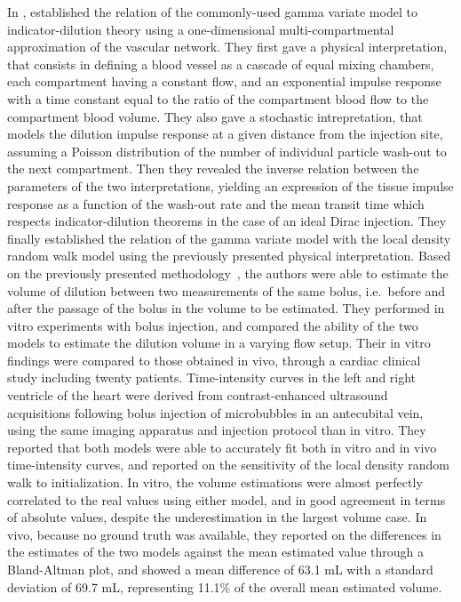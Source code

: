 In \citeyear{Mischi:2008fe}, \citet{Mischi:2008fe} established the relation of the commonly-used gamma variate model to indicator-dilution theory using a one-dimensional multi-compartmental approximation of the vascular network.
They first gave a physical interpretation, that consists in defining a blood vessel as a cascade of equal mixing chambers, each compartment having a constant flow, and an exponential impulse response with a time constant equal to the ratio of the compartment blood flow to the compartment blood volume.
They also gave a stochastic intrepretation, that models the dilution impulse response at a given distance from the injection site, assuming a Poisson distribution of the number of individual particle wash-out to the next compartment.
Then they revealed the inverse relation between the parameters of the two interpretations, yielding an expression of the tissue impulse response as a function of the wash-out rate and the mean transit time which respects indicator-dilution theorems in the case of an ideal Dirac injection.
They finally established the relation of the gamma variate model with the local density random walk model using the previously presented physical interpretation.
Based on the previously presented methodology~\cite{Mischi:2004cn}, the authors were able to estimate the volume of dilution between two measurements of the same bolus, i.e.~before and after the passage of the bolus in the volume to be estimated.
They performed in vitro experiments with bolus injection, and compared the ability of the two models to estimate the dilution volume in a varying flow setup.
Their in vitro findings were compared to those obtained in vivo, through a cardiac clinical study including twenty patients.
Time-intensity curves in the left and right ventricle of the heart were derived from contrast-enhanced ultrasound acquisitions following bolus injection of microbubbles in an antecubital vein, using the same imaging apparatus and injection protocol than in vitro.
They reported that both models were able to accurately fit both in vitro and in vivo time-intensity curves, and reported on the sensitivity of the local density random walk to initialization.
In vitro, the volume estimations were almost perfectly correlated to the real values using either model, and in good agreement in terms of absolute values, despite the underestimation in the largest volume case.
In vivo, because no ground truth was available, they reported on the differences in the estimates of the two models against the mean estimated value through a Bland-Altman plot, and showed a mean difference of 63.1 mL with a standard deviation of 69.7 mL, representing 11.1\% of the overall mean estimated volume.

